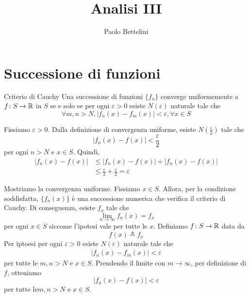\documentclass[a4paper]{article}
\title{Analisi III}
\author{Paolo Bettelini}
\date{}
\begin{document}
\maketitle
\tableofcontents

\pagebreak

\section{Successione di funzioni}

\begin{snippettheorem}{Criterio di Cauchy}
    Una successione di funzioni \(\{f_n\}\) converge uniformemente a \(f \colon S \to \mathbb{R}\)
    in \(S\) se e solo se per ogni \(\varepsilon > 0\) esiste \(N(\varepsilon)\) naturale tale che
    \[
        \forall m,n > N,
        |f_n(x) - f_m(x)| < \varepsilon, \forall x \in S
    \]
\end{snippettheorem}

\begin{snippetproof}{}
    \begin{iffproof}
        \item Fissiamo \(\varepsilon > 0\).
        Dalla definizione di convergenza uniforme,
        esiste \(N\left(\frac{\varepsilon }{2}\right)\) tale che
        \[
            \left|f_n(x) - f(x)\right| < \frac{\varepsilon}{2}
        \]
        per ogni \(n > N\) e \(x \in S\).
        Quindi, \begin{align*}
            \left|f_n(x) - f(x)\right| &\leq \left|f_n(x) - f(x)\right| + \left|f_n(x) - f(x)\right| \\
            &\leq \frac{\varepsilon}{2} + \frac{\varepsilon}{2} = \varepsilon
        \end{align*}
        \item Mostriamo la convergenza uniforme. Fissiamo \(x \in S\).
        Allora, per la condizione soddisfatta, \(\{f_n(x)\}\) è una successione
        numerica che verifica il criterio di Cauchy. Di conseguenza, esiste
        \(f_x\) tale che
        \[
            \lim_{n \to \infty} f_n(x) = f_x
        \]
        per ogni \(x \in S\) siccome l'ipotesi vale per tutte le \(x\).
        Definiamo \(f \colon S \to \mathbb{R}\) data da
        \[
            f(x) \triangleq f_x
        \]
        Per iptoesi per ogni \(\varepsilon > 0\) esiste \(N(\varepsilon)\) naturale tale che
        \begin{align*}
            |f_n(x) - f_m(x)| < \varepsilon
        \end{align*}
        per tutte le \(m,n > N\) e \(x \in S\).
        Prendendo il limite con \(m \to \infty\), per definizione di \(f\), otteniamo
        \[
            |f_n(x) - f(x)| < \varepsilon
        \]
        per tutte le\(m,n > N\) e \(x \in S\).
    \end{iffproof}
\end{snippetproof}
\end{document}
